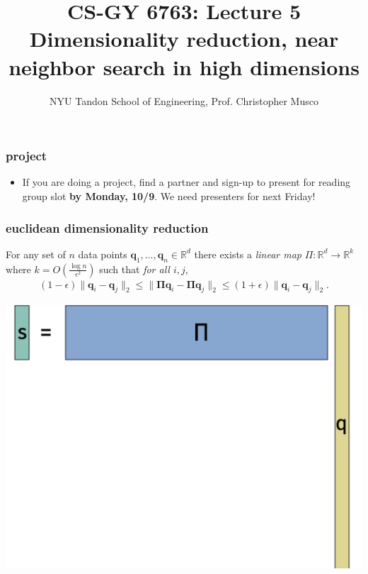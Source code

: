 \documentclass[compress]{beamer}
\title{CS-GY 6763: Lecture 5 \\ Dimensionality reduction, near neighbor search in high dimensions}
\author{NYU Tandon School of Engineering, Prof. Christopher Musco}
\date{}
\newcommand{\bs}[1]{\boldsymbol{#1}}
\newcommand{\bv}[1]{\mathbf{#1}}
\newcommand{\R}{\mathbb{R}}
\begin{document}
\begin{frame}
	\titlepage 
\end{frame}


\begin{frame}[t]
	\frametitle{project}
	\begin{itemize}
		\item If you are doing a project, find a partner and sign-up to present for reading group slot \textbf{by Monday, 10/9}. We need presenters for next Friday!
	\end{itemize}
\end{frame}

\begin{frame}
	\frametitle{euclidean dimensionality reduction}
	\begin{lemma}
		For any set of $n$ data points $\bv{q}_1,\ldots, \bv{q}_n \in \R^d$ there exists a \emph{linear map} $\Pi: \R^d \rightarrow \R^k$ where $k = O\left(\frac{\log n}{\epsilon^2}\right)$ such that \emph{for all $i,j$},
		\begin{align*}
			(1-\epsilon)\|\bv{q}_i - \bv{q}_j\|_2 \leq \|\bs{\Pi}\bv{q}_i - \bs{\Pi}\bv{q}_j\|_2 \leq (1+\epsilon)\|\bv{q}_i - \bv{q}_j\|_2.
		\end{align*}
	\end{lemma}
	\begin{center}
		\includegraphics[height=.45\textheight]{jl_sketch.png}
	\end{center}
\end{frame}
\end{document}
